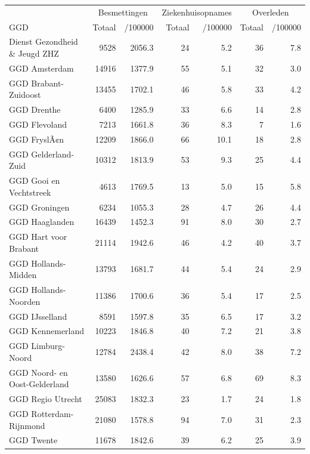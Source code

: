 \documentclass[
  english,
  man,floatsintext]{apa6}
\begin{document}
\begin{table}
\centering\begingroup\fontsize{10}{12}\selectfont

\begin{threeparttable}
\begin{tabular}{lrrrrrr}
\toprule
\multicolumn{1}{c}{ } & \multicolumn{2}{c}{Besmettingen} & \multicolumn{2}{c}{Ziekenhuisopnames} & \multicolumn{2}{c}{Overleden} \\
\cmidrule(l{3pt}r{3pt}){2-3} \cmidrule(l{3pt}r{3pt}){4-5} \cmidrule(l{3pt}r{3pt}){6-7}
GGD & Totaal & /100000 & Totaal & /100000 & Totaal & /100000\\
\midrule
Dienst Gezondheid \& Jeugd ZHZ & 9528 & 2056.3 & 24 & 5.2 & 36 & 7.8\\
GGD Amsterdam & 14916 & 1377.9 & 55 & 5.1 & 32 & 3.0\\
GGD Brabant-Zuidoost & 13455 & 1702.1 & 46 & 5.8 & 33 & 4.2\\
GGD Drenthe & 6400 & 1285.9 & 33 & 6.6 & 14 & 2.8\\
GGD Flevoland & 7213 & 1661.8 & 36 & 8.3 & 7 & 1.6\\
GGD FryslÃ¢n & 12209 & 1866.0 & 66 & 10.1 & 18 & 2.8\\
GGD Gelderland-Zuid & 10312 & 1813.9 & 53 & 9.3 & 25 & 4.4\\
GGD Gooi en Vechtstreek & 4613 & 1769.5 & 13 & 5.0 & 15 & 5.8\\
GGD Groningen & 6234 & 1055.3 & 28 & 4.7 & 26 & 4.4\\
GGD Haaglanden & 16439 & 1452.3 & 91 & 8.0 & 30 & 2.7\\
GGD Hart voor Brabant & 21114 & 1942.6 & 46 & 4.2 & 40 & 3.7\\
GGD Hollands-Midden & 13793 & 1681.7 & 44 & 5.4 & 24 & 2.9\\
GGD Hollands-Noorden & 11386 & 1700.6 & 36 & 5.4 & 17 & 2.5\\
GGD IJsselland & 8591 & 1597.8 & 35 & 6.5 & 17 & 3.2\\
GGD Kennemerland & 10223 & 1846.8 & 40 & 7.2 & 21 & 3.8\\
GGD Limburg-Noord & 12784 & 2438.4 & 42 & 8.0 & 38 & 7.2\\
GGD Noord- en Oost-Gelderland & 13580 & 1626.6 & 57 & 6.8 & 69 & 8.3\\
GGD Regio Utrecht & 25083 & 1832.3 & 23 & 1.7 & 24 & 1.8\\
GGD Rotterdam-Rijnmond & 21080 & 1578.8 & 94 & 7.0 & 31 & 2.3\\
GGD Twente & 11678 & 1842.6 & 39 & 6.2 & 25 & 3.9\\

\end{tabular}
\end{threeparttable}
\end{table}
\end{document}
